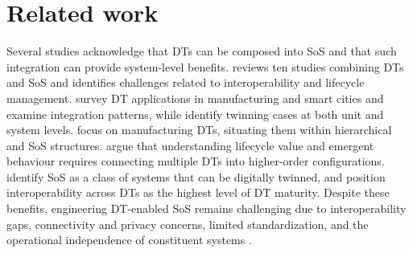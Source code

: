 \section{Related work}\label{sec:literature-review-related-work}

Several studies acknowledge that DTs can be composed into SoS and that such integration can provide system-level benefits. \citet{olsson2023systems-of-systems} reviews ten studies combining DTs and SoS and identifies challenges related to interoperability and lifecycle management. \citet{mylonas2021digital} survey DT applications in manufacturing and smart cities and examine integration patterns, while \citet{semeraro2021digital} identify twinning cases at both unit and system levels. \citet{bottjer2023review} focus on manufacturing DTs, situating them within hierarchical and SoS structures. \citet{bertoni2022designing} argue that understanding lifecycle value and emergent behaviour requires connecting multiple DTs into higher-order configurations. \citet{dalibor2022cross-domain} identify SoS as a class of systems that can be digitally twinned, and \citet{klar2023digital} position interoperability across DTs as the highest level of DT maturity. Despite these benefits, engineering DT-enabled SoS remains challenging due to interoperability gaps, connectivity and privacy concerns, limited standardization, and the operational independence of constituent systems \cite{michael2022integration,dietz2020digital,borth2019digital,gill2024automating}.